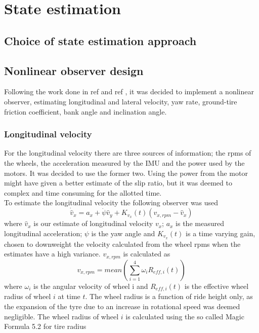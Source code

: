\section{State estimation}
\subsection{Choice of state estimation approach}
\subsection{Nonlinear observer design}


Following the work done in ref \cite{Automatica08} and ref \cite{MainStateEst}, it was decided to implement a nonlinear observer, estimating longitudinal and lateral velocity, yaw rate, ground-tire friction coefficient, bank angle and inclination angle. \par

\subsubsection{Longitudinal velocity}
For the longitudinal velocity there are three sources of information; the rpms of the wheels, the acceleration measured by the IMU and the power used by the motors. It was decided to use the former two. Using the power from the motor might have given a better estimate of the slip ratio, but it was deemed to complex and time consuming for the allotted time. \\ 

To estimate the longitudinal velocity the following observer was used
\begin{equation}
    \dot{\hat{v}}_x = a_x + \dot{\psi}\hat{v}_y + K_{v_x}(t)(v_{x,rpm} - \hat{v}_x)
\end{equation}
where $\hat{v}_x$ is our estimate of longitudinal velocity $v_x$; $a_x$ is the measured longitudinal acceleration; $\psi$ is the yaw angle and $K_{v_x}(t)$ is a time varying gain, chosen to downweight the velocity calculated from the wheel rpms when the estimates have a high variance. $v_{x,rpm}$ is calculated as 
\begin{equation}
    v_{x,rpm} = mean(\sum_{i=1}^{4} \omega_{i}R_{eff,i}(t))
\end{equation}
where $\omega_i$ is the angular velocity of wheel i and $R_{eff,i}(t)$ is the effective wheel radius of wheel $i$ at time $t$. The wheel radius is a function of ride height only, as the expansion of the tyre due to an increase in rotational speed was deemed negligible. The wheel radius of wheel $i$ is calculated using the so called Magic Formula 5.2 for tire radius \cite{MagicFormula5_2}

